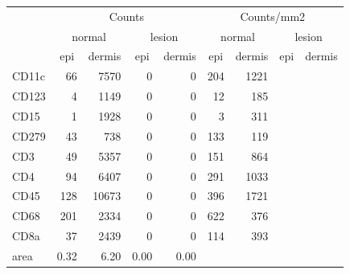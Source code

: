 \documentclass{article}
\begin{document}
\begin{tabular}{lrrrr|rrrr}
   \hline
 
         \multicolumn{1}{c}{} & \multicolumn{4}{c|}{Counts} & \multicolumn{4}{c}{Counts/mm2} \\ 
         \multicolumn{1}{c}{} & \multicolumn{2}{c}{normal} & \multicolumn{2}{c|}{lesion} & \multicolumn{2}{c}{normal} & \multicolumn{2}{c}{lesion}  \\ 
         \multicolumn{1}{c}{} & \multicolumn{1}{c}{epi} & dermis & \multicolumn{1}{c}{epi} & \multicolumn{1}{c|}{dermis} & \multicolumn{1}{c}{epi} & dermis & \multicolumn{1}{c}{epi} & dermis  \\ 
         \hline
    CD11c & 66 & 7570 & 0 & 0 & 204 & 1221 &  &  \\ 
  CD123 & 4 & 1149 & 0 & 0 & 12 & 185 &  &  \\ 
  CD15 & 1 & 1928 & 0 & 0 & 3 & 311 &  &  \\ 
  CD279 & 43 & 738 & 0 & 0 & 133 & 119 &  &  \\ 
  CD3 & 49 & 5357 & 0 & 0 & 151 & 864 &  &  \\ 
  CD4 & 94 & 6407 & 0 & 0 & 291 & 1033 &  &  \\ 
  CD45 & 128 & 10673 & 0 & 0 & 396 & 1721 &  &  \\ 
  CD68 & 201 & 2334 & 0 & 0 & 622 & 376 &  &  \\ 
  CD8a & 37 & 2439 & 0 & 0 & 114 & 393 &  &  \\ 
  area & 0.32 & 6.20 & 0.00 & 0.00 &    &    &    &    \\ 
   \hline
\end{tabular}
\end{document}
